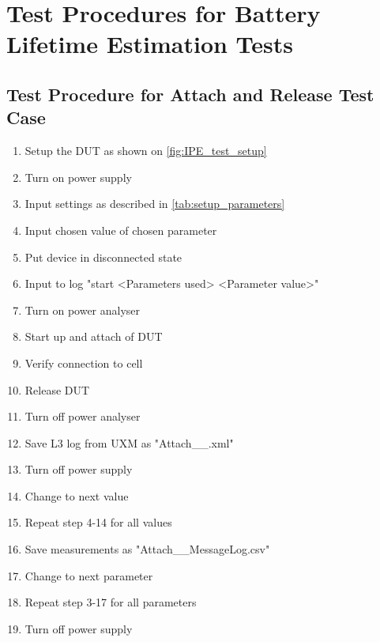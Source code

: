 \section{Test Procedures for Battery Lifetime Estimation Tests}
\label{app:test_procedures}

\subsection{Test Procedure for Attach and Release Test Case}
\begin{enumerate}
\item Setup the \gls{DUT} as shown on \autoref{fig:IPE_test_setup}
\item Turn on power supply 
\item Input settings as described in \autoref{tab:setup_parameters}
\item Input chosen value of chosen parameter
\item Put device in disconnected state 
\item Input to log "start <Parameters used> <Parameter value>"
\item Turn on power analyser
\item Start up and attach of DUT
\item Verify connection to cell
\item Release DUT
\item Turn off power analyser
\item Save L3 log from UXM as "Attach\_<Parameters used>\_<Parameters value>.xml"
\item Turn off power supply
\item Change to next value
\item Repeat step 4-14 for all values
\item Save measurements as "Attach\_<Parameters used>\_MessageLog.csv"
\item Change to next parameter
\item Repeat step 3-17 for all parameters
\item Turn off power supply
\end{enumerate}

